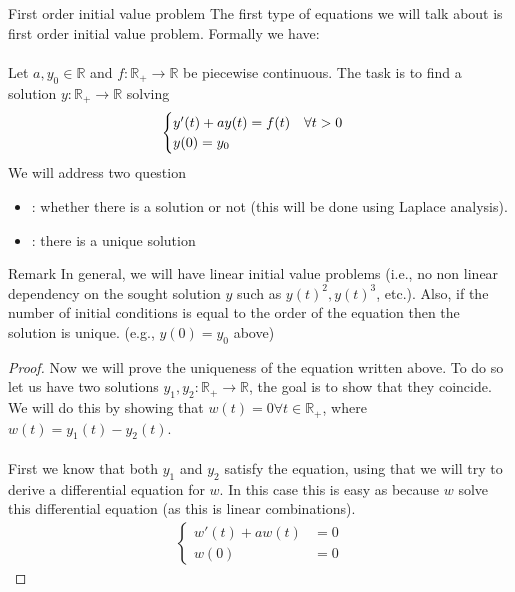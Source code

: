 \begin{parag}{First order initial value problem}
The first type of equations we will talk about is first order initial value problem. Formally we have:\\
$ $\\
Let $a, y_0 \in \mathbb{R}$ and $f: \mathbb{R}_+ \to \mathbb{R}$ be piecewise continuous. The task is to find a solution $y : \mathbb{R}_+ \to \mathbb{R}$ solving 
\begin{align*} 
	\begin{cases}
		y'\left(t\right) + ay\left(t\right) = f\left(t\right) \mathspace \forall t > 0\\
		y\left(0\right) =  y_0
	\end{cases}
	\end{align*}
	We will address two question
	\begin{itemize}
		\item {}: whether there is a solution or not (this will be done using Laplace analysis).
		\item {}: there is a unique solution
	\end{itemize}
	\begin{subparag}{Remark}
	    In general, we will have linear initial value problems (i.e., no non linear dependency on the sought solution $y$ such as $y\left(t\right)^2, y\left(t\right)^3$, etc.). Also, if the number of initial conditions is equal to the order of the equation then the solution is unique. (e.g.,  $y\left(0\right) = y_0$ above)
	\end{subparag}
	\begin{proof}
	Now we will prove the uniqueness of the equation written above. To do so let us have two solutions $y_1, y_2 : \mathbb{R}_+ \to \mathbb{R}$, the goal is to show that they coincide. We will do this by showing that $w\left(t\right) = 0 \forall t \in \mathbb{R}_+$, where $w\left(t\right) =  y_1\left(t\right) - y_2\left(t\right)$.\\
	$ $\\
	First we know that both $y_1$ and $y_2$ satisfy the equation, using that we will try to derive a differential equation for $w$. In this case this is easy as because $w$ solve this differential equation (as this is linear combinations).
	\begin{align*} 
		\begin{cases}
			w'\left(t\right) + a w\left(t\right) &= 0\\
			w\left(0\right) &= 0
		\end{cases}

\end{align*}
\end{proof}
\end{parag}
